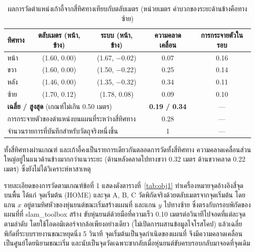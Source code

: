 \documentclass[a4paper,12pt]{report}
\begin{document}
\begin{table}[H]
\centering
\caption[ผลการวัดตำแหน่งวัตถุจากสี่ทิศทาง (บทที่ 5)]{ผลการวัดตำแหน่งเก้าอี้จากสี่ทิศทางเทียบกับตลับเมตร (หน่วยเมตร ค่าบวกของระยะด้านข้างคือทางซ้าย)}
\label{tab:obj4}
\small
\begin{tabular}{|l|c|c|c|c|}
\hline
\textbf{ทิศทาง} & \textbf{ตลับเมตร (หน้า, ข้าง)} & \textbf{ระบบ (หน้า, ข้าง)} & \textbf{ความคลาดเคลื่อน} & \textbf{การกระจายตัวในรอบ} \\
\hline
หน้า & (1.60, 0.00) & (1.67, $-$0.02) & 0.07 & 0.16 \\
\hline
ขวา & (1.60, 0.00) & (1.50, $-$0.22) & 0.25 & 0.14 \\
\hline
หลัง & (1.46, 0.00) & (1.35, $-$0.32) & 0.34 & 0.11 \\
\hline
ซ้าย & (1.70, 0.12) & (1.78, 0.08) & 0.09 & 0.10 \\
\hline
\multicolumn{3}{|l|}{\textbf{เฉลี่ย / สูงสุด} (เกณฑ์ไม่เกิน 0.50 เมตร)} & \textbf{0.19 / 0.34} & --- \\
\hline
\multicolumn{3}{|l|}{การกระจายตัวของตำแหน่งบนแผนที่ระหว่างสี่ทิศทาง} & 0.28 & --- \\
\hline
\multicolumn{3}{|l|}{จำนวนรายการที่บันทึกสำหรับวัตถุจริงหนึ่งชิ้น} & 1 & --- \\
\hline
\end{tabular}
\end{table}

ทั้งสี่ทิศทางผ่านเกณฑ์ และเก้าอี้คงเป็นรายการเดียวกันตลอดการวัดทั้งสี่ทิศทาง
ความคลาดเคลื่อนส่วนใหญ่อยู่ในแนวด้านข้างมากกว่าแนวระยะ
(ด้านหลังคลาดไปทางขวา 0.32 เมตร ด้านขวาคลาด 0.22 เมตร)
ซึ่งยังไม่ได้วิเคราะห์หาสาเหตุ

รายละเอียดของการวัดตามเกณฑ์ข้อที่ 1 แสดงดังตารางที่~\ref{tab:obj1}
ทำเครื่องหมายจุดอ้างอิงสี่จุดบนพื้น ได้แก่ จุดเริ่มต้น (HOME) และจุด A, B, C
วัดพิกัดจริงด้วยตลับเมตรจากจุดเริ่มต้น
โดยแกน $x$ อยู่ตามทิศหัวของหุ่นยนต์ขณะเริ่มสร้างแผนที่ และแกน $y$ ไปทางซ้าย
ซึ่งตรงกับกรอบพิกัดของแผนที่ที่ slam\_toolbox สร้าง
ขับหุ่นยนต์ด้วยมือที่ความเร็ว 0.10 เมตรต่อวินาทีไปจอดที่แต่ละจุดตามลำดับ
โดยใช้โอดอมิเตอร์จากล้อเพียงอย่างเดียว (ไม่เปิดการผสานข้อมูลไจโรสโคป)
แล้วเฉลี่ยพิกัดที่ระบบรายงานขณะหยุดนิ่ง 5 วินาที
จุดเริ่มต้นเป็นจุดกำเนิดของแผนที่ จึงมีความคลาดเคลื่อนเป็นศูนย์โดยนิยามขณะเริ่ม
และนับเป็นจุดวัดเฉพาะขากลับเมื่อหุ่นยนต์ขับครบรอบกลับมาจอดที่จุดเดิม
\end{document}
